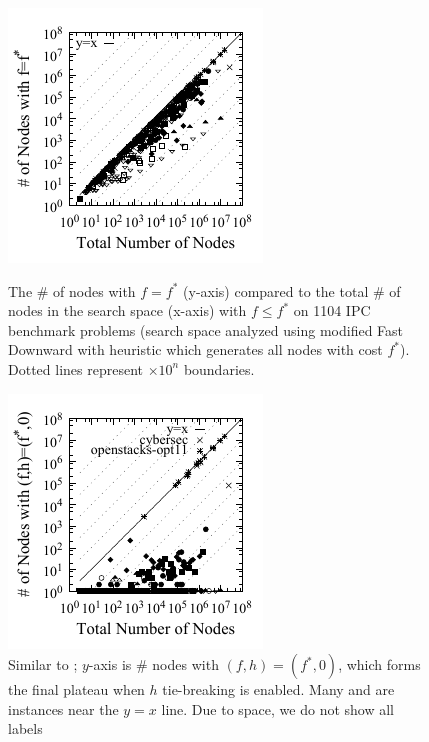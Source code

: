 \begin{figure}[bt]
 \newcommand{\minilength}{0.36\textwidth}
 \newcommand{\minisep}{0.02\textwidth}
 \begin{minipage}[t]{\minilength}
  \centering
 \includegraphics{tables/aaai16-frontier/aaai16prelim3/lmcut_frontier_noh-front-mono.pdf}
 \caption{
 The \# of nodes with $f=f^*$ (y-axis) compared to the
 total \# of nodes in the search space (x-axis) with $f\leq f^*$ on 1104 IPC benchmark problems
  (search space analyzed using modified Fast Downward with \lmcut heuristic which 
  generates all nodes with cost $f^*$).
  Dotted lines represent $\times 10^n$ boundaries.
  }
 \label{fig:plateau-noh}
 \end{minipage}
 \hfill
 \begin{minipage}[t]{\minilength}
  \centering
  \includegraphics{tables/aaai16-frontier/aaai16prelim3/lmcut_frontier-front-mono.pdf}
  \caption{
  Similar to ; $y$-axis is
  \# nodes with $(f,h)=(f^*,0)$, which forms the final
  plateau when $h$ tie-breaking is enabled.
  Many  and  are instances near the $y=x$ line.
  Due to space, we do not show all labels
}
\end{minipage}
\end{figure}
